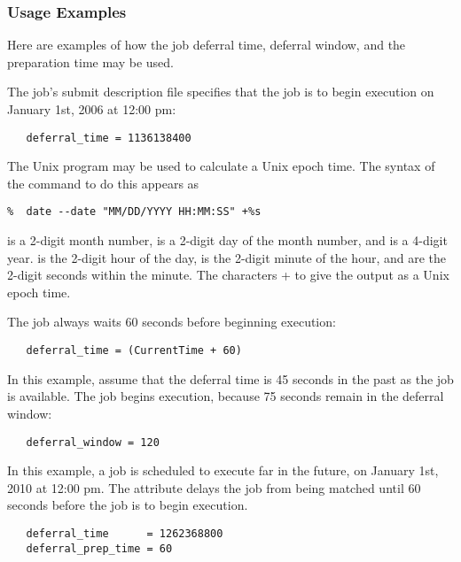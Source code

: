 \subsubsection{Usage Examples}
\label{sec:JobDeferral-Examples}

Here are examples of how the job deferral time,
deferral window, and the preparation time may be used.

The job's submit description file specifies that
the job is to begin execution 
on January 1st, 2006 at 12:00 pm:

\begin{verbatim} 
   deferral_time = 1136138400
\end{verbatim} 

The Unix  program may be used to calculate
a Unix epoch time.
The syntax of the command to do this appears as
\begin{verbatim} 
%  date --date "MM/DD/YYYY HH:MM:SS" +%s
\end{verbatim} 

\verb@MM@ is a 2-digit month number,
\verb@DD@ is a 2-digit day of the month number, and
\verb@YYYY@ is a 4-digit year.
\verb@HH@ is the 2-digit hour of the day,
\verb@MM@ is the 2-digit minute of the hour, and
\verb@SS@ are the 2-digit seconds within the minute.
The characters \verb@+%s@ tell the \Prog{date} program
to give the output as a Unix epoch time.

The job always waits 60 seconds before
beginning execution:

\begin{verbatim} 
   deferral_time = (CurrentTime + 60)
\end{verbatim}

In this example, assume that the deferral time is 45 seconds
in the past as the job is available.
The job begins execution, because 75 seconds remain in the
deferral window:

\begin{verbatim} 
   deferral_window = 120
\end{verbatim}

In this example, a job is scheduled to execute
far in the future,
on January 1st, 2010 at 12:00 pm. 
The  attribute delays the job 
from being matched until 60 seconds before the job is to begin execution. 

\begin{verbatim}
   deferral_time      = 1262368800
   deferral_prep_time = 60
\end{verbatim}

